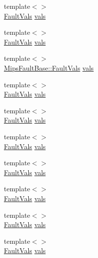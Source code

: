\begin{DoxyCompactItemize}
\item 
{\footnotesize template$<$$>$ }\\\hyperlink{structMipsISA_1_1MipsFaultBase_1_1FaultVals}{FaultVals} \hyperlink{classMipsISA_1_1MipsFault_a8b3c2006cfd550d551232a82b397bbca}{vals}
\item 
{\footnotesize template$<$$>$ }\\\hyperlink{structMipsISA_1_1MipsFaultBase_1_1FaultVals}{FaultVals} \hyperlink{classMipsISA_1_1MipsFault_a8b3c2006cfd550d551232a82b397bbca}{vals}
\item 
{\footnotesize template$<$$>$ }\\\hyperlink{structMipsISA_1_1MipsFaultBase_1_1FaultVals}{MipsFaultBase::FaultVals} \hyperlink{classMipsISA_1_1MipsFault_a50008688f18bfb8180039ca4b99b552f}{vals}
\item 
{\footnotesize template$<$$>$ }\\\hyperlink{structMipsISA_1_1MipsFaultBase_1_1FaultVals}{FaultVals} \hyperlink{classMipsISA_1_1MipsFault_a8b3c2006cfd550d551232a82b397bbca}{vals}
\item 
{\footnotesize template$<$$>$ }\\\hyperlink{structMipsISA_1_1MipsFaultBase_1_1FaultVals}{FaultVals} \hyperlink{classMipsISA_1_1MipsFault_a8b3c2006cfd550d551232a82b397bbca}{vals}
\item 
{\footnotesize template$<$$>$ }\\\hyperlink{structMipsISA_1_1MipsFaultBase_1_1FaultVals}{FaultVals} \hyperlink{classMipsISA_1_1MipsFault_a8b3c2006cfd550d551232a82b397bbca}{vals}
\item 
{\footnotesize template$<$$>$ }\\\hyperlink{structMipsISA_1_1MipsFaultBase_1_1FaultVals}{FaultVals} \hyperlink{classMipsISA_1_1MipsFault_a8b3c2006cfd550d551232a82b397bbca}{vals}
\item 
{\footnotesize template$<$$>$ }\\\hyperlink{structMipsISA_1_1MipsFaultBase_1_1FaultVals}{FaultVals} \hyperlink{classMipsISA_1_1MipsFault_a8b3c2006cfd550d551232a82b397bbca}{vals}
\item 
{\footnotesize template$<$$>$ }\\\hyperlink{structMipsISA_1_1MipsFaultBase_1_1FaultVals}{FaultVals} \hyperlink{classMipsISA_1_1MipsFault_a8b3c2006cfd550d551232a82b397bbca}{vals}
\item 
{\footnotesize template$<$$>$ }\\\hyperlink{structMipsISA_1_1MipsFaultBase_1_1FaultVals}{FaultVals} \hyperlink{classMipsISA_1_1MipsFault_a8b3c2006cfd550d551232a82b397bbca}{vals}

\end{DoxyCompactItemize}
